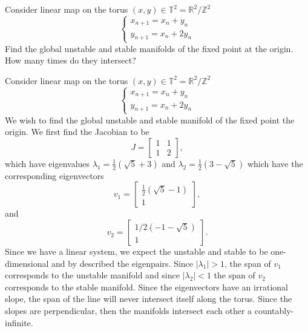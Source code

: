 \documentclass[12pt]{report}
\begin{document}
\newpage




\begin{problem}
    Consider linear map on the torus $(x,y) \in \mathbb{T}^2 =  \mathbb{R}^2  /  \mathbb{Z}^2$
    \begin{equation}
    \left\{\begin{array}{l}
    x_{n+1} = x_n + y_n \\
    y_{n+1} = x_n + 2 y_n  
    \end{array}\right.
    \end{equation}
    Find the global unstable and stable manifolds of the fixed point at the origin.  How many times do they intersect?

\end{problem}

\begin{solution}

    \noindent
    Consider linear map on the torus $(x,y) \in \mathbb{T}^2 =  \mathbb{R}^2  /  \mathbb{Z}^2$
    \begin{equation}
        \left\{\begin{array}{l}
        x_{n+1} = x_n + y_n \\
        y_{n+1} = x_n + 2 y_n  
        \end{array}\right.
    \end{equation}
    We wish to find the global unstable and stable manifold of the fixed point the origin. We first find the Jacobian to be 
    \[ 
        J = \begin{bmatrix}
            1 & 1\\
            1 & 2
        \end{bmatrix},
    \]
    which have eigenvalues $\lambda_1 = \frac{1}{2} \left(\sqrt{5}+3\right)$ and $\lambda_2 = \frac{1}{2} \left(3-\sqrt{5}\right)$ which have the corresponding eigenvectors
    \[ 
        v_1 = \begin{bmatrix}
            \frac{1}{2} \left(\sqrt{5}-1\right)\\
            1
        \end{bmatrix},
    \]
    and
    \[ 
        v_2 = \begin{bmatrix}
            1/2 (-1 - \sqrt{5})\\
            1
        \end{bmatrix}.
    \]
    Since we have a linear system, we expect the unstable and stable to be one-dimensional and by described the eigenpairs. Since $|\lambda_1| > 1$, the span of $v_1$ corresponds to the unstable manifold and since $|\lambda_2| < 1$ the span of $v_2$ corresponds to the stable manifold. Since the eigenvectors have an irrational slope, the span of the line will never intersect itself along the torus. Since the slopes are perpendicular, then the manifolds intersect each other a countably-infinite. 



\end{solution}
\end{document}

